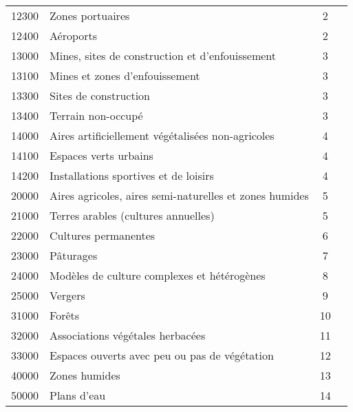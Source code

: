 \begin{table}[ht]
\begin{tabularx}{\textwidth}{c Y c c}
		12300 & Zones portuaires & 2 & \\
		12400 & Aéroports & 2 & \\
		13000 & Mines, sites de construction et d'enfouissement & 3 & \\
		13100 & Mines et zones d'enfouissement & 3 & \\
		13300 & Sites de construction & 3 & \\
		13400 & Terrain non-occupé & 3 & \\
		14000 & Aires artificiellement végétalisées non-agricoles & 4 & \\
		14100 & Espaces verts urbains & 4 & \\
		14200 & Installations sportives et de loisirs & 4 & \\
		20000 & Aires agricoles, aires semi-naturelles et zones humides & 5 & \\
		21000 & Terres arables (cultures annuelles) & 5 & \\
		22000 & Cultures permanentes & 6 & \\
		23000 & Pâturages & 7 & \\
		24000 & Modèles de culture complexes et hétérogènes & 8 & \\
		25000 & Vergers & 9 & \\
		31000 & Forêts & 10 & \\
		32000 & Associations végétales herbacées & 11 & \\
		33000 & Espaces ouverts avec peu ou pas de végétation & 12 & \\
		40000 & Zones humides & 13 & \\
		50000 & Plans d'eau & 14 & \\
		\bottomrule
	\end{tabularx}
\end{table}

